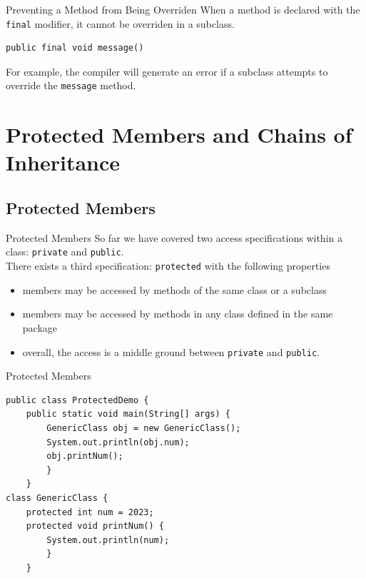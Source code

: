 \documentclass[11pt]{beamer}
\begin{document}
\begin{frame}[fragile]{Preventing a Method from Being Overriden}
    When a method is declared with the \texttt{final} modifier, it cannot be overriden in a subclass.
    \begin{lstlisting}
public final void message()
    \end{lstlisting}
    For example, the compiler will generate an error if a subclass attempts to override the \texttt{message} method.
\end{frame}

\section{Protected Members and Chains of Inheritance}
\subsection{Protected Members}
\begin{frame}{Protected Members}
    So far we have covered two access specifications within a class: \texttt{private} and \texttt{public}. \\ \vspace{1em}
    There exists a third specification: \texttt{protected} with the following properties
    \begin{itemize}
        \item members may be accessed by methods of the same class or a subclass
        \item members may be accessed by methods in any class defined in the same package
        \item overall, the access is a middle ground between \texttt{private} and \texttt{public}.
    \end{itemize}
\end{frame}

\begin{frame}[fragile]{Protected Members}
    \begin{lstlisting}[basicstyle=\ttfamily\footnotesize]
public class ProtectedDemo {
    public static void main(String[] args) {
        GenericClass obj = new GenericClass();
        System.out.println(obj.num);
        obj.printNum();
        }
    }
class GenericClass {
    protected int num = 2023;
    protected void printNum() {
        System.out.println(num);
        }
    }
    \end{lstlisting}
\end{frame}
\end{document}
